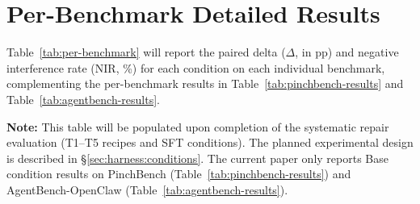 \section{Per-Benchmark Detailed Results}
\label{app:per-benchmark}

Table~\ref{tab:per-benchmark} will report the paired delta ($\Delta$, in pp) and negative interference rate (NIR, \%) for each condition on each individual benchmark, complementing the per-benchmark results in Table~\ref{tab:pinchbench-results} and Table~\ref{tab:agentbench-results}.

\textbf{Note:} This table will be populated upon completion of the systematic repair evaluation (T1--T5 recipes and SFT conditions). The planned experimental design is described in \S\ref{sec:harness:conditions}. The current paper only reports Base condition results on PinchBench (Table~\ref{tab:pinchbench-results}) and AgentBench-OpenClaw (Table~\ref{tab:agentbench-results}).

\begin{table}[h]
\centering
\caption{Per-benchmark test results: paired delta ($\Delta$, pp) and NIR (\%). Results will be reported separately for AgentBench-OC and PinchBench upon completion of the repair evaluation pipeline. [Placeholder --- to be filled]}
\label{tab:per-benchmark}
\end{table}

